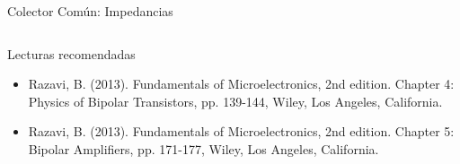 \documentclass[t,aspectratio=169]{beamer}
\begin{document}
\begin{frame}{Colector Común: Impedancias}

\begin{columns}
\begin{column}{0.5\textwidth}
\end{column}
\begin{column}{0.5\textwidth}
\end{column}
\end{columns}
    
\end{frame}


\begin{frame}{Lecturas recomendadas}

\begin{itemize}
    \item Razavi, B. (2013). Fundamentals of Microelectronics, 2nd edition. Chapter 4: Physics of Bipolar Transistors, pp. 139-144, Wiley, Los Angeles, California.
    \item Razavi, B. (2013). Fundamentals of Microelectronics, 2nd edition. Chapter 5: Bipolar Amplifiers, pp. 171-177, Wiley, Los Angeles, California.
\end{itemize}
    
\end{frame}
\end{document}
